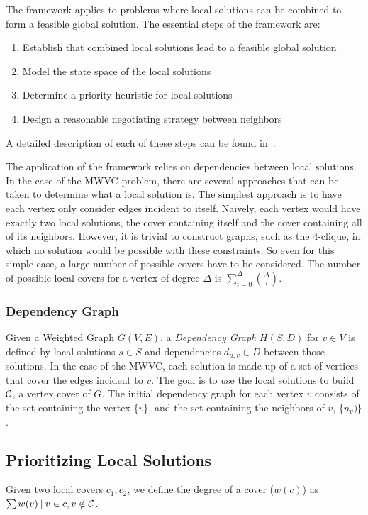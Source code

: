 The framework applies to problems where local solutions can be combined to form a feasible global solution. The essential steps of the framework are: 
\begin{enumerate}
\item Establish that combined local solutions lead to a feasible global solution
\item Model the state space of the local solutions
\item Determine a priority heuristic for local solutions
\item Design a reasonable negotiating strategy between neighbors
\end{enumerate} 
A detailed description of each of these steps can be found in~\cite{IPDPS.2008.45361}.

The application of the framework relies on dependencies between local solutions. In the case of the MWVC problem, there are several approaches that can be taken to determine what a local solution is. The simplest approach is to have each vertex only consider edges incident to itself. Naively, each vertex would have exactly two local solutions, the cover containing itself and the cover containing all of its neighbors. However, it is trivial to construct graphs, such as the 4-clique, in which no solution would be possible with these constraints. So even for this simple case, a large number of possible covers have to be considered. The number of possible local covers for a vertex of degree $\Delta$ is $\sum_{i=0}^\Delta \binom{\Delta}{i}$.

\subsubsection{Dependency Graph}
Given a Weighted Graph $G(V,E)$, a {\em Dependency Graph} $H(S,D)$ for $v \in V$ is defined by local solutions $s \in S$ and dependencies $d_{u,v} \in D$ between those solutions. In the case of the MWVC, each solution is made up of a set of vertices that cover the edges incident to $v$. The goal is to use the local solutions to build ${\mathcal C}$, a vertex cover of $G$. The initial dependency graph for each vertex $v$ consists of the set containing the vertex $\{v\}$, and the set containing the neighbors of $v$, $\{n_v)\}$. 

\subsection{Prioritizing Local Solutions}

Given two local covers $c_1, c_2$, we define the degree of a cover ($w(c)$) as $\sum w(v)\:|\: v \in c, v \notin {\mathcal C}$.  

